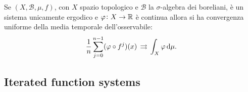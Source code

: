 \begin{thm}
    Se $ (X, \mathcal{B}, \mu, f) $, con $ X $ spazio topologico e $ \mathcal{B} $ la $ \sigma $-algebra dei boreliani, è un sistema unicamente ergodico e $ \varphi \colon X \to \mathbb{R} $ è continua allora si ha convergenza uniforme della media temporale dell'osservabile:
    \[
        \frac{1}{n} \sum_{j=0}^{n-1} (\varphi \circ f^j)(x) \, \touf \, \int_X \varphi \dif{\mu}.
    \]
\end{thm}

\subsection{Iterated function systems}
